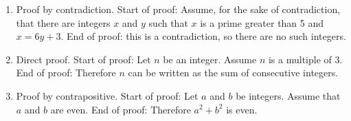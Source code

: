 \documentclass[10pt,]{book}
\theoremstyle{plain}
\theoremstyle{definition}
\theoremstyle{definition}
\theoremstyle{definition}
\theoremstyle{definition}
\numberwithin{equation}{chapter}
\begin{document}
\begin{enumerate}[label=(\alph*)]
\item\hypertarget{li-717}{}\hypertarget{p-2075}{}%
Proof by contradiction. Start of proof: Assume, for the sake of contradiction, that there are integers \(x\) and \(y\) such that \(x\) is a prime greater than 5 and \(x = 6y + 3\). End of proof: \textellipsis{} this is a contradiction, so there are no such integers.%
\item\hypertarget{li-718}{}\hypertarget{p-2076}{}%
Direct proof. Start of proof: Let \(n\) be an integer. Assume \(n\) is a multiple of 3. End of proof: Therefore \(n\) can be written as the sum of consecutive integers.%
\item\hypertarget{li-719}{}\hypertarget{p-2077}{}%
Proof by contrapositive. Start of proof: Let \(a\) and \(b\) be integers. Assume that \(a\) and \(b\) are even. End of proof: Therefore \(a^2 + b^2\) is even.%
\end{enumerate}
%
\par\smallskip
\end{document}
